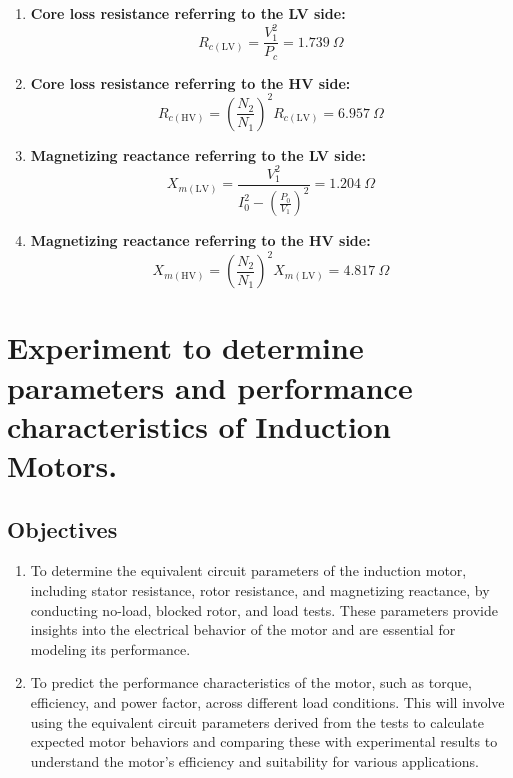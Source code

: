 \documentclass[12pt,a4paper]{report}
\begin{document}
\begin{enumerate}
\begin{enumerate}
    \item \textbf{Core loss resistance referring to the LV side:} 
    \begin{equation}
        R_{c(\text{LV})} = \frac{V_1^2}{P_c} = 1.739 \ \Omega
    \end{equation}

    \item \textbf{Core loss resistance referring to the HV side:}
    \begin{equation}
        R_{c(\text{HV})} = \left( \frac{N_2}{N_1} \right)^2 R_{c(\text{LV})} = 6.957 \ \Omega
    \end{equation}

    \item \textbf{Magnetizing reactance referring to the LV side:}
    \begin{equation}
        X_{m(\text{LV})} = \frac{V_1^2}{I_0^2 - \left( \frac{P_0}{V_1} \right)^2} = 1.204 \ \Omega
    \end{equation}

    \item \textbf{Magnetizing reactance referring to the HV side:}
    \begin{equation}
        X_{m(\text{HV})} = \left( \frac{N_2}{N_1} \right)^2 X_{m(\text{LV})} = 4.817 \ \Omega
    \end{equation}
\end{enumerate}

\end{enumerate}


\chapter{Experiment to determine parameters and performance characteristics of Induction Motors.}
\section{Objectives}
\begin{enumerate}
    \item To determine the equivalent circuit parameters of the induction motor, including stator resistance, rotor resistance, and magnetizing reactance, by conducting no-load, blocked rotor, and load tests. These parameters provide insights into the electrical behavior of the motor and are essential for modeling its performance.
    \item To predict the performance characteristics of the motor, such as torque, efficiency, and power factor, across different load conditions. This will involve using the equivalent circuit parameters derived from the tests to calculate expected motor behaviors and comparing these with experimental results to understand the motor's efficiency and suitability for various applications.
\end{enumerate}
\end{document}
